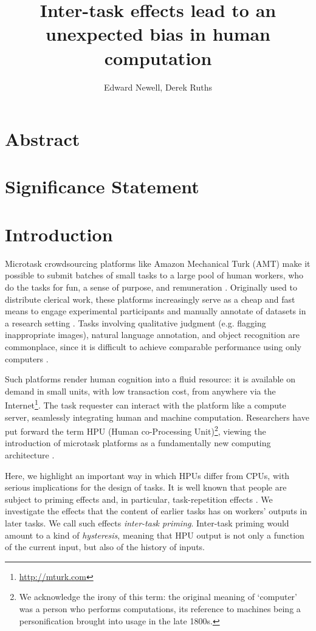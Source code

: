\documentclass[a4paper]{report}
\title{Inter-task effects lead to an unexpected bias in human computation}
\author{Edward Newell, Derek Ruths}
\begin{document}
\maketitle
\section*{Abstract}
\section*{Significance Statement}
\section*{Introduction}

Microtask crowdsourcing platforms like Amazon Mechanical Turk (AMT) make it 
possible to submit batches of small tasks to a large pool of human workers, 
who do the tasks for fun, a sense of purpose, and remuneration 
\cite{kazai2013analysis, Antin20122925}.  
Originally used to distribute clerical work, these platforms 
increasingly serve as a cheap and fast means to engage experimental 
participants and manually annotate of datasets in a research 
setting \cite{snow2008cheap}.  
Tasks involving qualitative
judgment (e.g. flagging inappropriate images), natural language annotation,
and object recognition are commonplace, since it is difficult to achieve 
comparable performance using only computers \cite{yuen2011survey}.

Such platforms render human cognition into a fluid resource: it is available 
on demand in small units, with low transaction 
cost, from anywhere via the 
Internet\footnote{\href{http://mturk.com}{http://mturk.com}}.
The task requester can 
interact with the platform like a compute server, seamlessly 
integrating human and machine computation.  Researchers have put forward the 
term HPU (Human co-Processing Unit)\footnote{We acknowledge the irony of this 
term: the original meaning of `computer' was a person who performs 
computations, its reference to machines being a personification brought into 
usage in the late 1800s\cite{Dictionary:hl}.}, viewing the introduction of 
microtask platforms as a fundamentally new computing architecture
\cite{5543192}.  

Here, we highlight an important way in which HPUs differ from CPUs, with 
serious implications for the design of tasks.  It is well known that people 
are subject to priming effects 
\cite{BJOP:BJOP1796, No2007, beller1971priming} and, in particular, task-repetition effects
\cite{Gass1999549, sohn2001task}.  
We investigate the effects that the content of earlier tasks has on workers'
outputs in later tasks.  We call such effects 
\textit{inter-task priming}.  Inter-task priming would amount to a kind of
\textit{hysteresis}, meaning that HPU output is not only a function of the 
current input, but also of the history of inputs.
\end{document}
